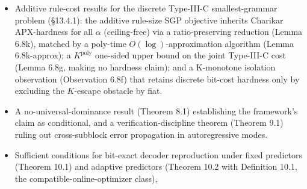 \documentclass[
]{article}
\begin{document}
\begin{itemize}
  transformer's discrete autoregressive field with \emph{unconditional}
  submodularity (the noise-floor calibration disappears; Remark 7.15a), but
  with a \#P-hard value-oracle obstacle that has no Gaussian analogue. That
  hardness is \emph{orthogonal} to the deployed encoder: causal coding and
  byte-granular random access are exactly polynomial (one forward pass per
  symbol; Remark 7.15b), the \#P-hardness living only in the \emph{optional}
  non-contiguous support-selection lever. The bounded-order exact-oracle
  restriction is a clean new open problem (exact finite-block hidden-Markov
  Shannon entropy), here \emph{bracketed} on all sides:
  poly-time-$\varepsilon$-approximable under a filter-stability hypothesis
  (Remark 7.15c); every integer-order R\'enyi entropy exactly polynomial via
  a product-chain agreement identity, with the min-entropy NP-hard (HMM
  consensus) and the collision entropy $H_2$ a free poly lower bound (Remark
  7.15d); and the exact oracle pinned in $[\,\text{poly},\mathrm{FP}^{\#P}\,]$
  with \emph{both} natural attacks --- predicate-encoding hardness and
  history-filtering algorithm --- provably obstructed (Remark 7.15e: the
  read-once / $\#\mathrm L\subseteq\mathrm{FP}$ barrier and the non-collapsing
  Blackwell measure). Thus the support-selection complexity is \emph{resolved
  for the operative high-order predictor} and \emph{mapped} for the
  theoretical bounded-order residual.
\item
  Additive rule-cost results for the discrete Type-III-C
  smallest-grammar problem (§13.4.1): the additive rule-size SGP
  objective inherits Charikar APX-hardness for all $\alpha$
  (ceiling-free) via a ratio-preserving reduction (Lemma 6.8k),
  matched by a poly-time $O(\log)$-approximation algorithm
  (Lemma 6.8k-approx); a $K^{\mathrm{poly}}$ one-sided upper bound on
  the joint Type-III-C cost (Lemma 6.8g, making no hardness claim);
  and a K-monotone isolation observation (Observation 6.8f) that
  retains discrete bit-cost hardness only by excluding the
  $K$-escape obstacle by fiat.
\item
  A no-universal-dominance result (Theorem 8.1) establishing the
  framework's claim as conditional, and a verification-discipline
  theorem (Theorem 9.1) ruling out cross-subblock error propagation
  in autoregressive modes.
\item
  Sufficient conditions for bit-exact decoder reproduction under
  fixed predictors (Theorem 10.1) and adaptive predictors (Theorem
  10.2 with Definition 10.1, the compatible-online-optimizer class),

\end{itemize}
\end{document}
